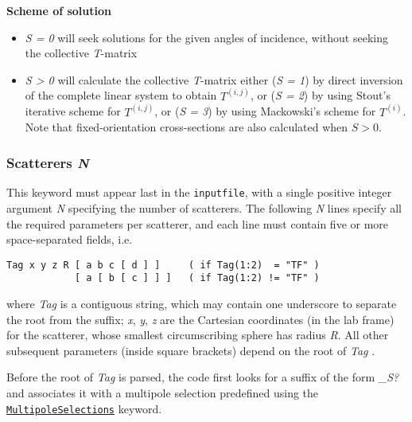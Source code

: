 \documentclass[
]{article}
\providecommand{\tightlist}{%
  \setlength{\itemsep}{0pt}\setlength{\parskip}{0pt}}
\begin{document}
\textbf{Scheme of solution}

\begin{itemize}
\tightlist
\item
  \emph{S = 0} will seek solutions for the given angles of incidence,
  without seeking the collective \emph{T}-matrix
\item
  \emph{S \textgreater{} 0} will calculate the collective
  \emph{T}-matrix either (\emph{S = 1}) by direct inversion of the
  complete linear system to obtain \(T^{(i,j)}\), or (\emph{S = 2}) by
  using Stout's iterative scheme for \(T^{(i,j)}\), or (\emph{S = 3}) by
  using Mackowski's scheme for \(T^{(i)}\). Note that fixed-orientation
  cross-sections are also calculated when \(S > 0\).
\end{itemize}

\hypertarget{scatterers-n}{%
\subsubsection{\texorpdfstring{Scatterers
\emph{N}}{Scatterers N}}\label{scatterers-n}}

This keyword must appear last in the \texttt{inputfile}, with a single
positive integer argument \emph{N} specifying the number of scatterers.
The following \emph{N} lines specify all the required parameters per
scatterer, and each line must contain five or more space-separated
fields, i.e.

\begin{verbatim}
Tag x y z R [ a b c [ d ] ]     ( if Tag(1:2)  = "TF" )   
            [ a [ b [ c ] ] ]   ( if Tag(1:2) != "TF" )
\end{verbatim}

where \emph{Tag} is a contiguous string, which may contain one
underscore to separate the root from the suffix; \emph{x}, \emph{y},
\emph{z} are the Cartesian coordinates (in the lab frame) for the
scatterer, whose smallest circumscribing sphere has radius \emph{R}. All
other subsequent parameters (inside square brackets) depend on the root
of \emph{Tag} .

Before the root of \emph{Tag} is parsed, the code first looks for a
suffix of the form \emph{\_S?} and associates it with a multipole
selection predefined using the
\protect\hyperlink{MultipoleSelections}{\texttt{MultipoleSelections}}
keyword.
\end{document}

